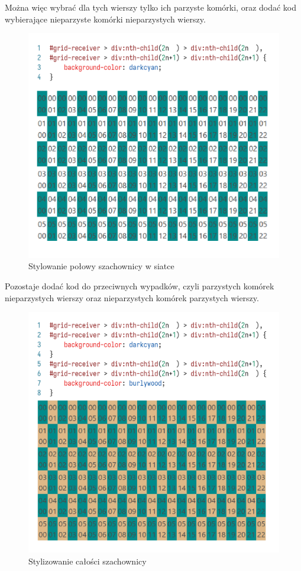 \documentclass[licencjacka]{pracadypl}
\begin{document}
Można więc wybrać dla tych wierszy tylko ich parzyste komórki, oraz dodać kod wybierające nieparzyste komórki nieparzystych wierszy.

\begin{figure}[H]
  \centering
  \includegraphics[width=\linewidth/\real{1.6}]{images/codeui-checkerboard-half-coloring.png}
  \caption{Stylowanie połowy szachownicy w siatce}
  \label{fig:codeui-checkerboard-half-coloring}
\end{figure}

Pozostaje dodać kod do przeciwnych wypadków, czyli parzystych komórek nieparzystych wierszy oraz nieparzystych komórek parzystych wierszy.

\begin{figure}[H]
  \centering
  \includegraphics[width=\linewidth/\real{1.6}]{images/codeui-checkerboard-coloring.png}
  \caption{Stylizowanie całości szachownicy}
  \label{fig:codeui-checkerboard-coloring}
\end{figure}
\end{document}
